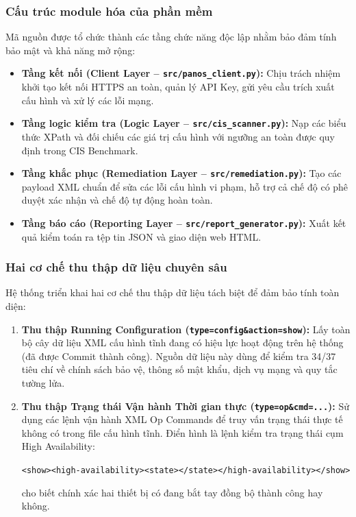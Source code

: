 \documentclass[12pt,a4paper]{article}
\begin{document}
\subsubsection{Cấu trúc module hóa của phần mềm}
\noindent Mã nguồn được tổ chức thành các tầng chức năng độc lập nhằm bảo đảm tính bảo mật và khả năng mở rộng:
\begin{itemize}
    \item \textbf{Tầng kết nối (Client Layer -- \texttt{src/panos\_client.py}):} Chịu trách nhiệm khởi tạo kết nối HTTPS an toàn, quản lý API Key, gửi yêu cầu trích xuất cấu hình và xử lý các lỗi mạng.
    \item \textbf{Tầng logic kiểm tra (Logic Layer -- \texttt{src/cis\_scanner.py}):} Nạp các biểu thức XPath và đối chiếu các giá trị cấu hình với ngưỡng an toàn được quy định trong CIS Benchmark.
    \item \textbf{Tầng khắc phục (Remediation Layer -- \texttt{src/remediation.py}):} Tạo các payload XML chuẩn để sửa các lỗi cấu hình vi phạm, hỗ trợ cả chế độ có phê duyệt xác nhận và chế độ tự động hoàn toàn.
    \item \textbf{Tầng báo cáo (Reporting Layer -- \texttt{src/report\_generator.py}):} Xuất kết quả kiểm toán ra tệp tin JSON và giao diện web HTML.
\end{itemize}

\subsubsection{Hai cơ chế thu thập dữ liệu chuyên sâu}
\noindent Hệ thống triển khai hai cơ chế thu thập dữ liệu tách biệt để đảm bảo tính toàn diện:
\begin{enumerate}
    \item \textbf{Thu thập Running Configuration (\texttt{type=config\&action=show}):} Lấy toàn bộ cây dữ liệu XML cấu hình tĩnh đang có hiệu lực hoạt động trên hệ thống (đã được Commit thành công). Nguồn dữ liệu này dùng để kiểm tra 34/37 tiêu chí về chính sách bảo vệ, thông số mật khẩu, dịch vụ mạng và quy tắc tường lửa.
    \item \textbf{Thu thập Trạng thái Vận hành Thời gian thực (\texttt{type=op\&cmd=...}):} Sử dụng các lệnh vận hành XML Op Commands để truy vấn trạng thái thực tế không có trong file cấu hình tĩnh. Điển hình là lệnh kiểm tra trạng thái cụm High Availability:
    \begin{center}
    \texttt{<show><high-availability><state></state></high-availability></show>}
    \end{center}
    cho biết chính xác hai thiết bị có đang bắt tay đồng bộ thành công hay không.
\end{enumerate}
\end{document}
